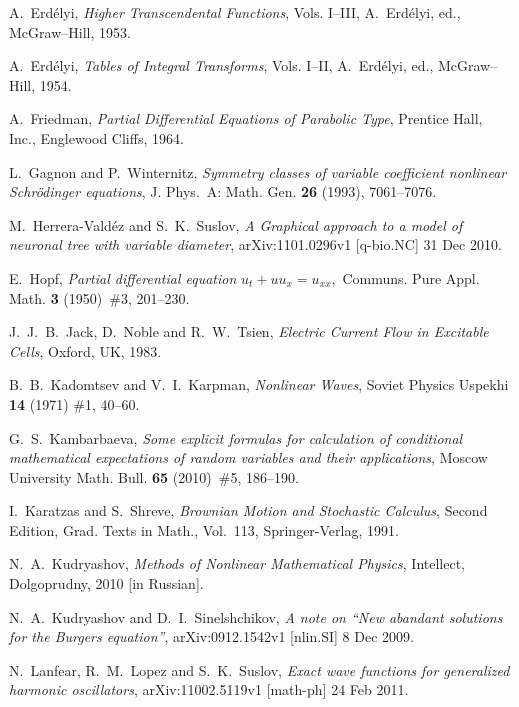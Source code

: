 \documentclass[12pt,reqno]{amsart}
\theoremstyle{plain}
\numberwithin{equation}{section}
\begin{document}
\begin{thebibliography}{99}
 A.~Erd\'{e}lyi, \textsl{Higher Transcendental Functions\/},
Vols. I--III, A.~Erd\'{e}lyi, ed., McGraw--Hill, 1953.

 A.~Erd\'{e}lyi, \textsl{Tables of Integral Transforms\/},
Vols. I--II, A.~Erd\'{e}lyi, ed., McGraw--Hill, 1954.

 A.~Friedman, \textsl{Partial Differential Equations of
Parabolic Type\/}, Prentice Hall, Inc., Englewood Cliffs, 1964.

 L.~Gagnon and P.~Winternitz, \emph{Symmetry classes of
variable coefficient nonlinear Schr\"{o}dinger equations\/}, J. Phys.~A:
Math. Gen. \textbf{26} (1993), 7061--7076.

 M.~Herrera-Vald\'{e}z and S.~K.~Suslov, \emph{A
Graphical approach to a model of neuronal tree with variable diameter\/},
arXiv:1101.0296v1 [q-bio.NC] 31 Dec 2010.

 E.~Hopf, \emph{Partial differential equation }$u_{t}+uu_{x}=u_{xx},$ Communs. Pure Appl. Math. \textbf{3} (1950)~\#3,
201--230.

 J.~J.~B.~Jack, D.~Noble and R.~W.~Tsien, \textsl{Electric Current Flow in Excitable Cells\/}, Oxford, UK, 1983.

 B.~B.~Kadomtsev and V.~I.~Karpman, \emph{Nonlinear
Waves\/}, Soviet Physics Uspekhi \textbf{14} (1971) \#1, 40--60.

 G.~S.~Kambarbaeva, \emph{Some explicit formulas for
calculation of conditional mathematical expectations of random variables and
their applications\/}, Moscow University Math. Bull. \textbf{65} (2010)~\#5,
186--190.

 I.~Karatzas and S.~Shreve, \textsl{Brownian Motion
and Stochastic Calculus\/}, Second Edition, Grad. Texts in Math., Vol.~113,
Springer-Verlag, 1991.

 N.~A.~Kudryashov, \textsl{Methods of Nonlinear
Mathematical Physics\/}, Intellect, Dolgoprudny, 2010 [in Russian].

 N.~A.~Kudryashov and D.~I.~Sinelshchikov, \emph{A
note on \textquotedblleft New abandant solutions for the Burgers
equation\textquotedblright \/}, arXiv:0912.1542v1 [nlin.SI] 8 Dec 2009.

 N.~Lanfear, R.~M.~Lopez and S.~K.~Suslov, \emph{Exact
wave functions for generalized harmonic oscillators\/}, arXiv:11002.5119v1
[math-ph] 24 Feb 2011.


\end{thebibliography}
\end{document}
